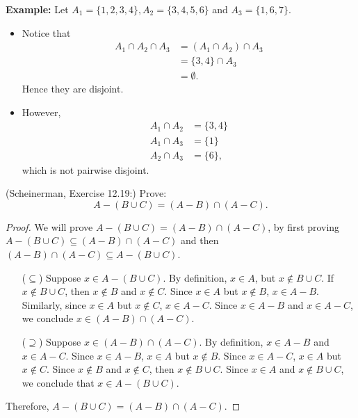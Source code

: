 \documentclass{article}
\theoremstyle{definition}
\begin{document}
\begin{solution}
\textbf{Example:} Let $A_1=\{1, 2, 3, 4\}, A_2=\{3, 4, 5, 6\}$ and $A_3=\{1, 6, 7\}$.
\begin{itemize}
\item Notice that 
\begin{align*}
A_1\cap A_2\cap A_3 &= (A_1\cap A_2)\cap A_3\\
&=\{3,4\}\cap A_3\\
&=\emptyset.
\end{align*} Hence they are disjoint.
\item However,
\begin{align*}
A_1\cap A_2 &=\{3, 4\}\\
A_1\cap A_3 &=\{1\}\\
A_2\cap A_3 &=\{6\},
\end{align*}
which is not pairwise disjoint.
\end{itemize}
\end{solution}


\begin{question}
   (Scheinerman, Exercise 12.19:)
   Prove:
   \[ A-(B\cup C)=(A-B)\cap(A-C).\]
\end{question}
\begin{solution}
\begin{proof}
We will prove $A-(B\cup C) = (A-B)\cap(A-C)$, by first proving $A-(B\cup C) \subseteq (A-B)\cap(A-C)$ and then $(A-B)\cap(A-C)\subseteq A-(B\cup C)$.
\begin{enumerate}
\item[($\subseteq$)] Suppose $x\in A-(B\cup C)$. By definition, $x\in A$, but $x\notin B\cup C$. If $x\notin B\cup C$, then $x\notin B$ and $x\notin C$. Since $x\in A$ but $x\notin B$, $x\in A-B$. Similarly, since $x\in A$ but $x\notin C$, $x\in A-C$. Since $x\in A-B$ and $x\in A-C$, we conclude $x\in (A-B)\cap(A-C)$.

\item [($\supseteq$)] Suppose $x\in (A-B)\cap(A-C)$. By definition, $x\in A-B$ and $x\in A-C$. Since $x\in A-B$, $x\in A$ but $x\notin B$. Since $x\in A-C$, $x\in A$ but $x\notin C$. Since $x\notin B$ and $x\notin C$, then $x\notin B\cup C$. Since $x\in A$ and $x\notin B\cup C$, we conclude that $x\in A-(B\cup C)$.
\end{enumerate}
Therefore, $A-(B\cup C) = (A-B)\cap(A-C)$.
\end{proof}
\end{solution}
\end{document}

